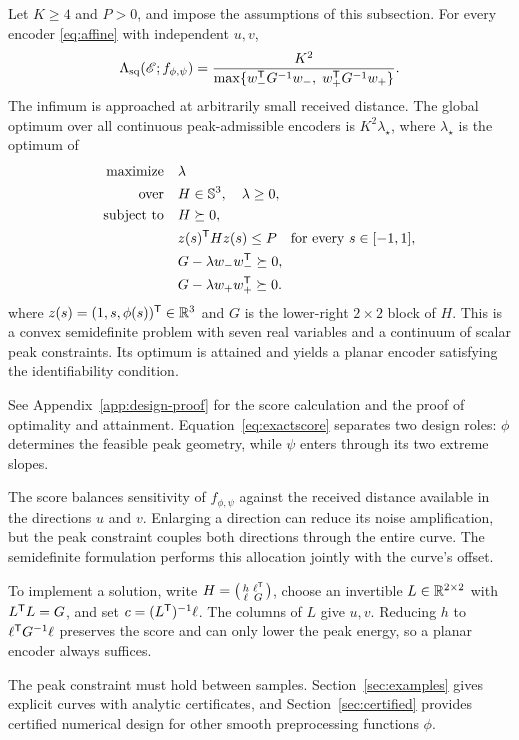 \begin{theorem}
\label{thm:sdp}
Let $K\ge4$ and $P>0$, and impose the assumptions of this subsection. For every encoder \eqref{eq:affine} with independent $u,v$,
\begin{equation}
 \Lambda_{\mathrm{sq}}(\mathscr E;f_{\phi,\psi})
 =\frac{K^2}{\max\{w_-^\mathsf T G^{-1}w_-,\;w_+^\mathsf T G^{-1}w_+\}}.
 \label{eq:exactscore}
\end{equation}
The infimum is approached at arbitrarily small received distance. The global optimum over all continuous peak-admissible encoders is $K^2\lambda_\star$, where $\lambda_\star$ is the optimum of
\begin{equation}
\begin{aligned}
 \text{maximize}\quad &\lambda\\
 \text{over}\quad &H\in\mathbb S^3,\quad\lambda\ge0,\\
 \text{subject to}\quad
 &H\succeq0,\\
 &z(s)^\mathsf T H z(s)\le P\quad\text{for every }s\in[-1,1],\\
 &G-\lambda w_-w_-^\mathsf T\succeq0,\\
 &G-\lambda w_+w_+^\mathsf T\succeq0.
\end{aligned}
\label{eq:sdp}
\end{equation}
where $z(s)=(1,s,\phi(s))^\mathsf T\in\mathbb R^3$ and $G$ is the lower-right $2\times2$ block of $H$. This is a convex semidefinite problem with seven real variables and a continuum of scalar peak constraints. Its optimum is attained and yields a planar encoder satisfying the identifiability condition.
\end{theorem}
See Appendix~\ref{app:design-proof} for the score calculation and the proof of optimality and attainment. Equation~\eqref{eq:exactscore} separates two design roles: $\phi$ determines the feasible peak geometry, while $\psi$ enters through its two extreme slopes.

The score balances sensitivity of $f_{\phi,\psi}$ against the received distance available in the directions $u$ and $v$. Enlarging a direction can reduce its noise amplification, but the peak constraint couples both directions through the entire curve. The semidefinite formulation performs this allocation jointly with the curve's offset.

To implement a solution, write $H=\left(\begin{smallmatrix}h&\ell^\mathsf T\\\ell&G\end{smallmatrix}\right)$, choose an invertible $L\in\mathbb R^{2\times2}$ with $L^{\mathsf T}L=G$, and set $c=(L^\mathsf T)^{-1}\ell$. The columns of $L$ give $u,v$. Reducing $h$ to $\ell^{\mathsf T}G^{-1}\ell$ preserves the score and can only lower the peak energy, so a planar encoder always suffices.

The peak constraint must hold between samples. Section~\ref{sec:examples} gives explicit curves with analytic certificates, and Section~\ref{sec:certified} provides certified numerical design for other smooth preprocessing functions $\phi$.
